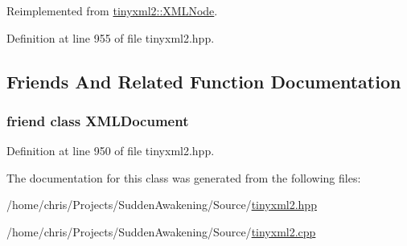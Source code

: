 Reimplemented from \hyperlink{classtinyxml2_1_1_x_m_l_node_a71f5ae90296dbe67979f83fe97073efa}{tinyxml2\-::\-X\-M\-L\-Node}.



Definition at line 955 of file tinyxml2.\-hpp.



\subsection{Friends And Related Function Documentation}
\hypertarget{classtinyxml2_1_1_x_m_l_unknown_a4eee3bda60c60a30e4e8cd4ea91c4c6e}{
\subsubsection[{X\-M\-L\-Document}]{\setlength{\rightskip}{0pt plus 5cm}friend class {\bf X\-M\-L\-Document}\hspace{0.3cm}{\ttfamily [friend]}}}\label{classtinyxml2_1_1_x_m_l_unknown_a4eee3bda60c60a30e4e8cd4ea91c4c6e}


Definition at line 950 of file tinyxml2.\-hpp.



The documentation for this class was generated from the following files\-:\begin{DoxyCompactItemize}
\item 
/home/chris/\-Projects/\-Sudden\-Awakening/\-Source/\hyperlink{tinyxml2_8hpp}{tinyxml2.\-hpp}\item 
/home/chris/\-Projects/\-Sudden\-Awakening/\-Source/\hyperlink{tinyxml2_8cpp}{tinyxml2.\-cpp}\end{DoxyCompactItemize}
